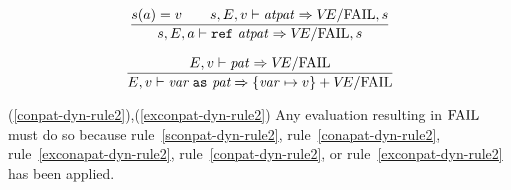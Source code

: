 \begin{equation}	%
\frac{\s(\A)=\V\qquad\s,\E,\V\ts\atpat\ra\VE/\fail,\s}
     {\s,\E,\A\ts\REF\ \atpat\ra \VE/\fail,\s}\index{57.0}
\end{equation}


\begin{equation}	%
\frac{\E,\V\ts\pat\ra\VE/\fail}
     {\E,\V\ts\layeredpata\ra\{\var\mapsto\V\}+\VE/\fail}
\end{equation}
%
%
\comments
\begin{description}
\item{(\ref{conpat-dyn-rule2}),(\ref{exconpat-dyn-rule2})}
  Any evaluation resulting in ${\rm FAIL}$ must do so because 
rule~\ref{sconpat-dyn-rule2},
rule~\ref{conapat-dyn-rule2},
rule~\ref{exconapat-dyn-rule2},
rule~\ref{conpat-dyn-rule2},
or rule~\ref{exconpat-dyn-rule2} has been
applied.
\end{description}
